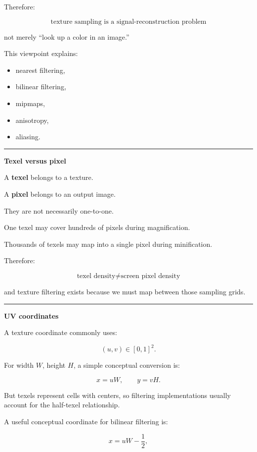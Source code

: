 Therefore:

\[
\boxed{
\text{texture sampling is a signal-reconstruction problem}
}
\]

not merely ``look up a color in an image.''

This viewpoint explains:

\begin{itemize}
\tightlist
\item
  nearest filtering,
\item
  bilinear filtering,
\item
  mipmaps,
\item
  anisotropy,
\item
  aliasing.
\end{itemize}

\begin{center}\rule{0.5\linewidth}{0.5pt}\end{center}

\textbf{Texel versus pixel}

A \textbf{texel} belongs to a texture.

A \textbf{pixel} belongs to an output image.

They are not necessarily one-to-one.

One texel may cover hundreds of pixels during magnification.

Thousands of texels may map into a single pixel during minification.

Therefore:

\[
\boxed{
\text{texel density}
\neq
\text{screen pixel density}
}
\]

and texture filtering exists because we must map between those sampling grids.

\begin{center}\rule{0.5\linewidth}{0.5pt}\end{center}

\textbf{UV coordinates}

A texture coordinate commonly uses:

\[
(u,v)\in[0,1]^2.
\]

For width \(W\), height \(H\), a simple conceptual conversion is:

\[
x=uW,
\qquad
y=vH.
\]

But texels represent cells with centers, so filtering implementations usually account for the half-texel relationship.

A useful conceptual coordinate for bilinear filtering is:

\[
x=uW-\frac12,
\]

